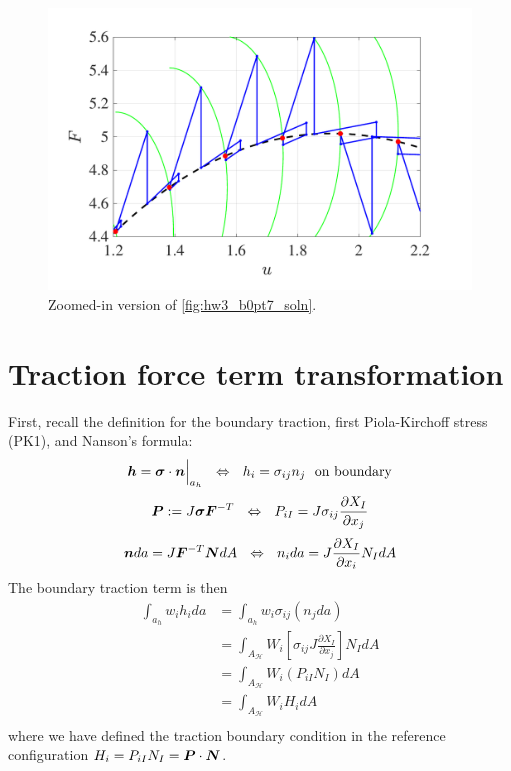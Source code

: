 \begin{figure}[!ht]
    \centering
    \includegraphics[width=0.7\linewidth]{homework/hw3/hw3_b0pt7_close.pdf}
    \caption{Zoomed-in version of \cref{fig:hw3_b0pt7_soln}.}
    \label{fig:hw3_b0pt7_close}
\end{figure}

\section{Traction force term transformation}

First, recall the definition for the boundary traction, first Piola-Kirchoff stress (PK1), and Nanson's formula:
\begin{equation}
    \bm{h} = \bm{\sigma} \cdot \bm{n}\Big|_{a_h} ~~ \Leftrightarrow ~~ h_i = \sigma_{ij} n_j ~~ \textrm{on boundary}
\end{equation}
\begin{equation}
    \bm{P} := J\bm{\sigma}\bm{F}^{-T} ~~ \Leftrightarrow ~~ P_{iI} = J \sigma_{ij} \frac{\partial X_I}{\partial x_j}
\end{equation}
\begin{equation}
    \bm{n}da = J\bm{F}^{-T}\bm{N}dA ~~ \Leftrightarrow ~~ n_i da = J\frac{\partial X_I}{\partial x_i} N_I dA
\end{equation}
The boundary traction term is then 
\begin{equation}
\begin{aligned}
    \int_{a_h} w_i h_i da &= \int_{a_h} w_i \sigma_{ij} \left(n_j da\right) \\
    &= \int_{A_\mathcal{H}} W_i \left[\sigma_{ij} J\frac{\partial X_I}{\partial x_j}\right] N_I dA \\
    &= \int_{A_\mathcal{H}} W_i \left(P_{iI} N_I\right) dA \\
    &= \int_{A_\mathcal{H}} W_i H_i dA \\
\end{aligned}
\end{equation}
where we have defined the traction boundary condition in the reference configuration $H_i = P_{iI} N_I = \bm{P} \cdot \bm{N}$. 

